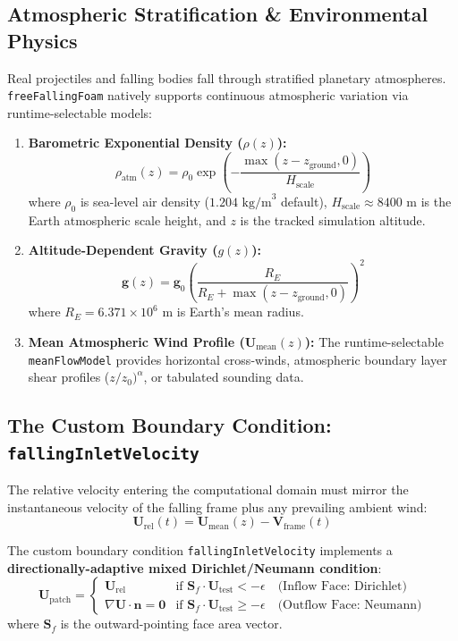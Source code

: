 \documentclass[11pt,a4paper]{article}
\newcommand{\vect}[1]{\mathbf{#1}}
\newcommand{\grad}{\nabla}
\newcommand{\vframe}{\vect{V}_{\mathrm{frame}}}
\begin{document}
\subsection{Atmospheric Stratification \& Environmental Physics}
Real projectiles and falling bodies fall through stratified planetary atmospheres. \texttt{freeFallingFoam} natively supports continuous atmospheric variation via runtime-selectable models:

\begin{enumerate}
    \item \textbf{Barometric Exponential Density ($\rho(z)$):}
    \begin{equation}
        \rho_{\mathrm{atm}}(z) = \rho_0 \exp\left( -\frac{\max(z - z_{\mathrm{ground}}, 0)}{H_{\mathrm{scale}}} \right)
    \end{equation}
    where $\rho_0$ is sea-level air density ($1.204\text{ kg/m}^3$ default), $H_{\mathrm{scale}} \approx 8400\text{ m}$ is the Earth atmospheric scale height, and $z$ is the tracked simulation altitude.
    
    \item \textbf{Altitude-Dependent Gravity ($g(z)$):}
    \begin{equation}
        \vect{g}(z) = \vect{g}_0 \left( \frac{R_E}{R_E + \max(z - z_{\mathrm{ground}}, 0)} \right)^2
    \end{equation}
    where $R_E = 6.371 \times 10^6\text{ m}$ is Earth's mean radius.
    
    \item \textbf{Mean Atmospheric Wind Profile ($\vect{U}_{\mathrm{mean}}(z)$):}
    The runtime-selectable \texttt{meanFlowModel} provides horizontal cross-winds, atmospheric boundary layer shear profiles ($z/z_0)^\alpha$, or tabulated sounding data.
\end{enumerate}

\subsection{The Custom Boundary Condition: \texttt{fallingInletVelocity}}
The relative velocity entering the computational domain must mirror the instantaneous velocity of the falling frame plus any prevailing ambient wind:
\begin{equation}
    \vect{U}_{\mathrm{rel}}(t) = \vect{U}_{\mathrm{mean}}(z) - \vframe(t)
\end{equation}

The custom boundary condition \texttt{fallingInletVelocity} implements a \textbf{directionally-adaptive mixed Dirichlet/Neumann condition}:
\begin{equation}
    \vect{U}_{\mathrm{patch}} = 
    \begin{cases}
        \vect{U}_{\mathrm{rel}} & \text{if } \vect{S}_f \cdot \vect{U}_{\mathrm{test}} < -\epsilon \quad \text{(Inflow Face: Dirichlet)} \\
        \grad \vect{U} \cdot \vect{n} = \vect{0} & \text{if } \vect{S}_f \cdot \vect{U}_{\mathrm{test}} \ge -\epsilon \quad \text{(Outflow Face: Neumann)}
    \end{cases}
\end{equation}
where $\vect{S}_f$ is the outward-pointing face area vector.
\end{document}
